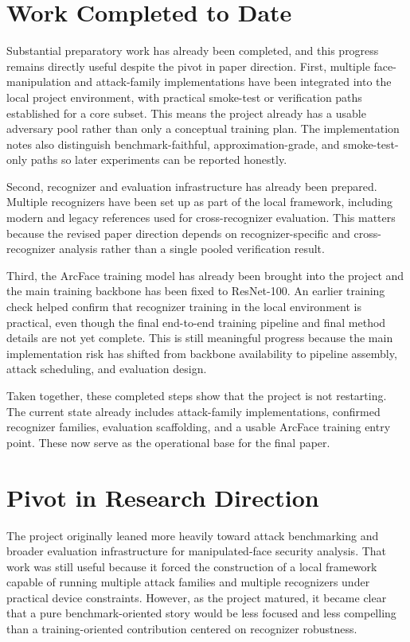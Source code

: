\documentclass[conference]{IEEEtran}
\begin{document}
\section{Work Completed to Date}
Substantial preparatory work has already been completed, and this progress
remains directly useful despite the pivot in paper direction. First, multiple
face-manipulation and attack-family implementations have been integrated into
the local project environment, with practical smoke-test or verification paths
established for a core subset. This means the project already has a usable
adversary pool rather than only a conceptual training plan. The implementation
notes also distinguish benchmark-faithful, approximation-grade, and
smoke-test-only paths so later experiments can be reported honestly.

Second, recognizer and evaluation infrastructure has already been prepared.
Multiple recognizers have been set up as part of the local framework, including
modern and legacy references used for cross-recognizer evaluation. This matters
because the revised paper direction depends on recognizer-specific and
cross-recognizer analysis rather than a single pooled verification result.

Third, the ArcFace training model has already been brought into the project and
the main training backbone has been fixed to ResNet-100. An earlier training
check helped confirm that recognizer training in the local environment is
practical, even though the final end-to-end training pipeline and final method
details are not yet complete. This is still meaningful progress because the
main implementation risk has shifted from backbone availability to pipeline
assembly, attack scheduling, and evaluation design.

Taken together, these completed steps show that the project is not restarting.
The current state already includes attack-family implementations, confirmed
recognizer families, evaluation scaffolding, and a usable ArcFace training
entry point. These now serve as the operational base for the final paper.

\section{Pivot in Research Direction}
The project originally leaned more heavily toward attack benchmarking and
broader evaluation infrastructure for manipulated-face security analysis. That
work was still useful because it forced the construction of a local framework
capable of running multiple attack families and multiple recognizers under
practical device constraints. However, as the project matured, it became clear
that a pure benchmark-oriented story would be less focused and less compelling
than a training-oriented contribution centered on recognizer robustness.
\end{document}
